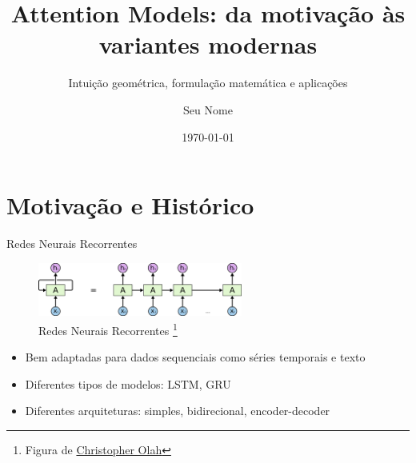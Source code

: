 \documentclass{beamer}
\title{Attention Models: da motivação às variantes modernas}
\subtitle{Intuição geométrica, formulação matemática e aplicações}
\author{Seu Nome}
\date{\today}
\begin{document}
\maketitle


\section{Motivação e Histórico}


\begin{frame}{Redes Neurais Recorrentes}

	\begin{figure}[h]
		\centering
		\includegraphics[width=0.6\textwidth]{assets/colah-RNN-unrolled.png}
		\caption{Redes Neurais Recorrentes \footnote{Figura de \href{https://colah.github.io/posts/2015-08-Understanding-LSTMs/}{Christopher Olah}}}
	\end{figure}

	\begin{itemize}
		\item Bem adaptadas para dados sequenciais como séries temporais e texto
		\item Diferentes tipos de modelos: LSTM, GRU
		\item Diferentes arquiteturas: simples, bidirecional, encoder-decoder
	\end{itemize}

\end{frame}
\end{document}

